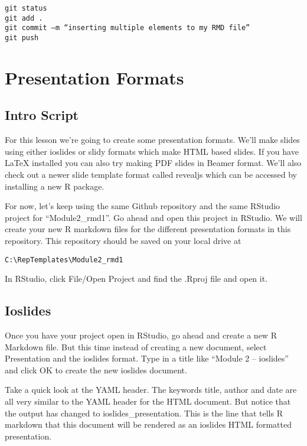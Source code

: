 \documentclass[]{book}
\theoremstyle{definition}
\theoremstyle{definition}
\theoremstyle{definition}
\theoremstyle{remark}
\begin{document}
\begin{verbatim}
git status
git add .
git commit –m “inserting multiple elements to my RMD file”
git push
\end{verbatim}

\chapter{Presentation Formats}\label{presentations}

\section{Intro Script}\label{intro-script}

For this lesson we're going to create some presentation formats. We'll
make slides using either ioslides or slidy formats which make HTML based
slides. If you have LaTeX installed you can also try making PDF slides
in Beamer format. We'll also check out a newer slide template format
called revealjs which can be accessed by installing a new R package.

For now, let's keep using the same Github repository and the same
RStudio project for ``Module2\_rmd1''. Go ahead and open this project in
RStudio. We will create your new R markdown files for the different
presentation formats in this repository. This repository should be saved
on your local drive at

\texttt{C:\textbackslash{}RepTemplates\textbackslash{}Module2\_rmd1}

In RStudio, click File/Open Project and find the .Rproj file and open
it.

\section{Ioslides}\label{ioslides}

Once you have your project open in RStudio, go ahead and create a new R
Markdown file. But this time instead of creating a new document, select
Presentation and the ioslides format. Type in a title like ``Module 2 --
ioslides'' and click OK to create the new ioslides document.

Take a quick look at the YAML header. The keywords title, author and
date are all very similar to the YAML header for the HTML document. But
notice that the output has changed to ioslides\_presentation. This is
the line that tells R markdown that this document will be rendered as an
ioslides HTML formatted presentation.
\end{document}
